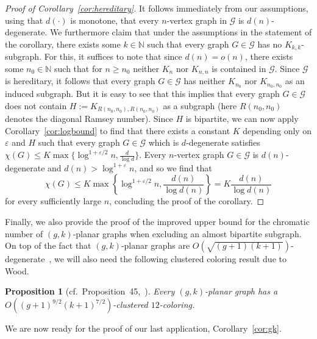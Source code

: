 \documentclass[10pt]{amsart}
\newtheorem{proposition}[theorem]{Proposition}
\theoremstyle{definition}
\begin{document}
\begin{proof}[Proof of Corollary~\ref{cor:hereditary}]
    It follows immediately from our assumptions, using that $d(\cdot)$ is monotone, that every $n$-vertex graph in $\mathcal{G}$ is $d(n)$-degenerate. We furthermore claim that under the assumptions in the statement of the corollary, there exists some $k\in \mathbb{N}$ such that every graph $G\in \mathcal{G}$ has no $K_{k,k}$-subgraph. For this, it suffices to note that since $d(n)=o(n)$, there exists some $n_0\in \mathbb{N}$ such that for $n\ge n_0$ neither $K_n$ nor $K_{n,n}$ is contained in $\mathcal{G}$. Since $\mathcal{G}$ is hereditary, it follows that every graph $G\in \mathcal{G}$ has neither $K_{n_0}$ nor $K_{n_0,n_0}$ as an induced subgraph. But it is easy to see that this implies that every graph $G\in \mathcal{G}$ does not contain $H:=K_{R(n_0,n_0),R(n_0,n_0)}$ as a subgraph (here $R(n_0,n_0)$ denotes the diagonal Ramsey number). Since $H$ is bipartite, we can now apply Corollary~\ref{cor:logbound} to find that there exists a constant $K$ depending only on $\varepsilon$ and $H$ such that every graph $G\in \mathcal{G}$ which is $d$-degenerate satisfies $\chi(G)\le K\max\{\log^{1+\varepsilon/2} n,\frac{d}{\log d}\}$. Every $n$-vertex graph $G\in \mathcal{G}$ is $d(n)$-degenerate and $d(n)>\log^{1+\varepsilon} n$, and so we find that
    $$\chi(G)\le K\max\left\{\log^{1+\varepsilon/2}n, \frac{d(n)}{\log d(n)}\right\}=K\frac{d(n)}{\log d(n)}$$ for every sufficiently large $n$, concluding the proof of the corollary.
    \end{proof}
Finally, we also provide the proof of the improved upper bound for the chromatic number of $(g,k)$-planar graphs when excluding an almost bipartite subgraph. On top of the fact that $(g,k)$-planar graphs are $O(\sqrt{(g+1)(k+1)})$-degenerate~\cite{demendez,wood}, we will also need the following clustered coloring result due to Wood.
\begin{proposition}[cf.~Proposition~45,~\cite{wood}]\label{prop:12clust}
Every $(g,k)$-planar graph has a $O((g+1)^{9/2}(k+1)^{7/2})$-clustered $12$-coloring.
\end{proposition}
We are now ready for the proof of our last application, Corollary~\ref{cor:gk}. 
\end{document}
